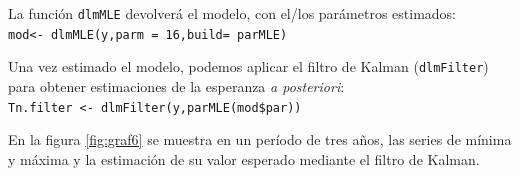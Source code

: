 \documentclass[12pt]{article}\usepackage[]{graphicx}\usepackage[]{color}
\begin{document}
La función \verb|dlmMLE| devolverá el modelo, con el/los parámetros estimados:\\
\verb|mod<- dlmMLE(y,parm = 16,build= parMLE)|

Una vez estimado el modelo, podemos aplicar el filtro de Kalman (\verb|dlmFilter|) para obtener estimaciones de la esperanza \textit{a posteriori}:\\
\verb|Tn.filter <- dlmFilter(y,parMLE(mod$par))|

En la figura \ref{fig:graf6} se muestra en un período de tres años, las series de mínima y máxima y la estimación de su valor esperado mediante el filtro de Kalman.


% 
% 
\end{document}
